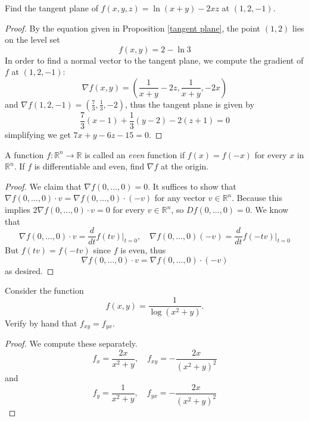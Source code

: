 \documentclass[openany]{book}
\newcommand{\R}{\mathbb{R}}
\begin{document}
\begin{prob}
    Find the tangent plane of $f(x,y,z)=\ln(x+y)-2xz$ at $(1,2,-1)$.
\end{prob}
\begin{proof}
    By the equation given in Proposition \ref{tangent plane}, the point $(1,2)$ lies on the level set 
    \begin{equation*}
        f(x,y)=2-\ln 3
    \end{equation*}
    In order to find a normal vector to the tangent plane, we compute the gradient of $f$ at $(1,2,-1)$:
    \begin{equation*}
        \nabla f(x,y)=\left(\frac{1}{x+y}-2z, \frac{1}{x+y}, -2x\right)
    \end{equation*}
    and $\nabla f(1,2, -1)=\left(\frac{7}{3}, \frac{1}{3}, -2\right)$, thus the tangent plane is given by 
    \begin{equation*}
        \frac{7}{3}(x-1)+\frac{1}{3}(y-2)-2(z+1)=0
    \end{equation*}
    simplifying we get $7x+y-6z-15=0$.
\end{proof}


\begin{prob}
    A function $f\colon\R^n\to\R$ is called an \textit{even} function if $f(x)=f(-x)$ for every $x$ in $\R^n$. If $f$ is differentiable and even, find $\nabla f$ at the origin.
\end{prob}
\begin{proof}
    We claim that $\nabla f(0,\dots,0)=0$. It suffices to show that $\nabla f(0,\dots, 0)\cdot v=\nabla f(0, \dots, 0)\cdot (-v)$ for any vector $v\in\R^n$. Because this implies $2\nabla f(0,\dots, 0)\cdot v=0$ for every $v\in\R^n$, so $Df(0,\dots, 0)=0$.
    We know that
    \[\nabla f(0,\dots, 0)\cdot v=\frac d{dt}f(tv)\bigg|_{t=0}, \quad \nabla f(0,\dots, 0)(-v)=\frac d{dt}f(-tv)\bigg|_{t=0}\]
    But $f(tv)=f(-tv)$ since $f$ is even, thus 
    \begin{equation*}
        \nabla f(0,\dots, 0)\cdot v=\nabla f(0,\dots, 0)\cdot (-v)
    \end{equation*}
    as desired.
\end{proof}



\begin{prob}
    Consider the function
    \[f(x,y)=\frac1{\log(x^2+y)}.\]
    Verify by hand that $f_{xy}=f_{yx}$.
\end{prob}
\begin{proof}
    We compute these separately.
    \begin{equation*}
        f_x=\frac{2x}{x^2+y}, \quad f_{xy}=-\frac{2x}{\left(x^2+y\right)^2}
    \end{equation*}
    and 
    \begin{equation*}
        f_y=\frac1{x^2+y}, \quad f_{yx}=-\frac{2x}{\left(x^2+y\right)^2}
    \end{equation*}
\end{proof}
\end{document}
